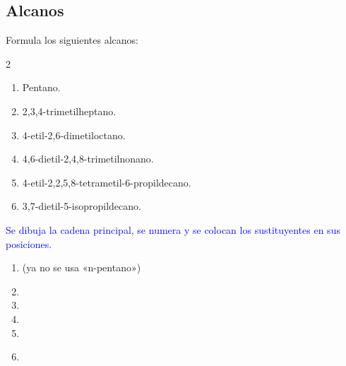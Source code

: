 
\subsection*{Alcanos}

\begin{exercise}
    Formula los siguientes alcanos:
    \begin{multicols}{2}
        \begin{enumerate}[label=\alph*)]
            \item Pentano.
            \item 2,3,4-trimetilheptano.
            \item 4-etil-2,6-dimetiloctano.
            \item 4,6-dietil-2,4,8-trimetilnonano.
            \item 4-etil-2,2,5,8-tetrametil-6-propildecano.
            \item 3,7-dietil-5-isopropildecano.
        \end{enumerate}
    \end{multicols}
    \begin{solu}
        \textcolor{blue}{Se dibuja la cadena principal, se numera y se colocan los sustituyentes en sus posiciones.}
        \begin{enumerate}[label=\alph*)]
            \item {} \quad (ya no se usa «n-pentano»)
            \item {}
            \item {}
            \item {}
            \item {}
            \item {}\\
        \end{enumerate}
    \end{solu}
\end{exercise}

